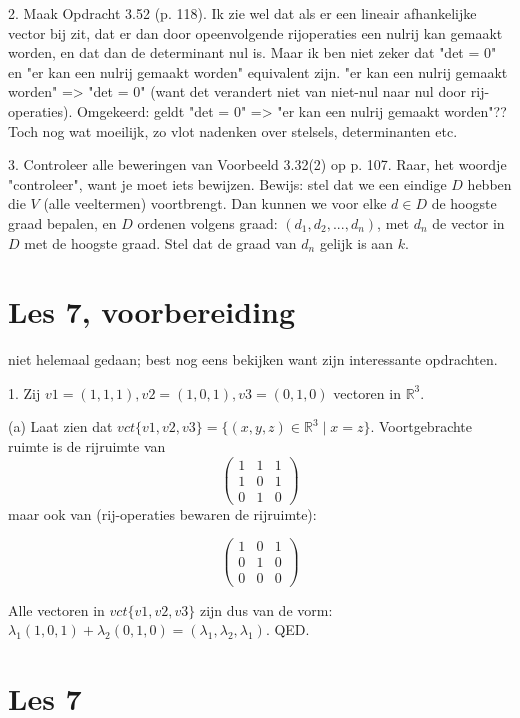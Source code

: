 \documentclass{article}
\begin{document}
2. Maak Opdracht 3.52 (p. 118).  
Ik zie wel dat als er een lineair afhankelijke vector bij zit, dat er dan door opeenvolgende rijoperaties een nulrij kan gemaakt worden, en dat dan de determinant nul is. Maar ik ben niet zeker dat "det = 0" en "er kan een nulrij gemaakt worden" equivalent zijn.  "er kan een nulrij gemaakt worden" => "det = 0" (want det verandert niet van niet-nul naar nul door rij-operaties). Omgekeerd: geldt "det = 0" => "er kan een nulrij gemaakt worden"?? Toch nog wat moeilijk, zo vlot nadenken over stelsels, determinanten etc. 

3. Controleer alle beweringen van Voorbeeld 3.32(2) op p. 107.
Raar, het woordje "controleer", want je moet iets bewijzen. Bewijs: stel dat we een eindige $D$ hebben die $V$ (alle veeltermen) voortbrengt. Dan kunnen we voor elke $d \in D$ de hoogste graad bepalen, en $D$ ordenen volgens graad: $(d_1, d_2, ..., d_n)$, met $d_n$ de vector in $D$ met de hoogste graad. Stel dat de graad van $d_n$ gelijk is aan $k$. 

\section*{Les 7, voorbereiding}

niet helemaal gedaan; best nog eens bekijken want zijn interessante opdrachten. 

1. Zij $v1 = (1, 1, 1), v2 = (1, 0, 1), v3 = (0, 1, 0)$ vectoren in $\mathbb{R}^3$.

(a) Laat zien dat $vct\{v1, v2, v3\} = \{(x, y, z) \in \mathbb{R}^3 \mid x = z\}$. 
Voortgebrachte ruimte is de rijruimte van 
\[
\begin{pmatrix}
    1&1&1\\
    1&0&1\\
    0&1&0
\end{pmatrix}
\] 
maar ook van (rij-operaties bewaren de rijruimte): 

\[
\begin{pmatrix}
    1&0&1\\
    0&1&0\\
    0&0&0
\end{pmatrix}
\]

Alle vectoren in $vct\{v1, v2, v3\}$ zijn dus van de vorm: 
$\lambda_1 (1,0,1) + \lambda_2 (0,1,0) = (\lambda_1, \lambda_2, \lambda_1)$. QED. 

\section*{Les 7}
\end{document}
